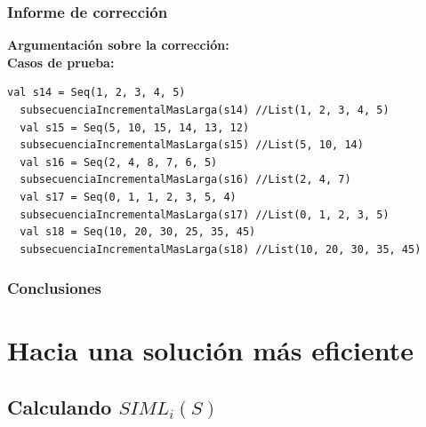 \documentclass[12pt, a4paper]{article}
\begin{document}
\subsubsection{Informe de corrección}
\textbf{Argumentación sobre la corrección: \\}
\textbf{Casos de prueba: \\}
\begin{lstlisting}[caption=Casos de prueba para la función subsecuenciaIncrementalMasLarga, label=lst:scala_code]
  val s14 = Seq(1, 2, 3, 4, 5)
  subsecuenciaIncrementalMasLarga(s14) //List(1, 2, 3, 4, 5)
  val s15 = Seq(5, 10, 15, 14, 13, 12)
  subsecuenciaIncrementalMasLarga(s15) //List(5, 10, 14)
  val s16 = Seq(2, 4, 8, 7, 6, 5)
  subsecuenciaIncrementalMasLarga(s16) //List(2, 4, 7)
  val s17 = Seq(0, 1, 1, 2, 3, 5, 4)
  subsecuenciaIncrementalMasLarga(s17) //List(0, 1, 2, 3, 5)
  val s18 = Seq(10, 20, 30, 25, 35, 45)
  subsecuenciaIncrementalMasLarga(s18) //List(10, 20, 30, 35, 45)
\end{lstlisting}
\subsubsection{Conclusiones}
\section{Hacia una solución más eficiente}
\subsection{Calculando $SIML_i(S)$}
\end{document}
